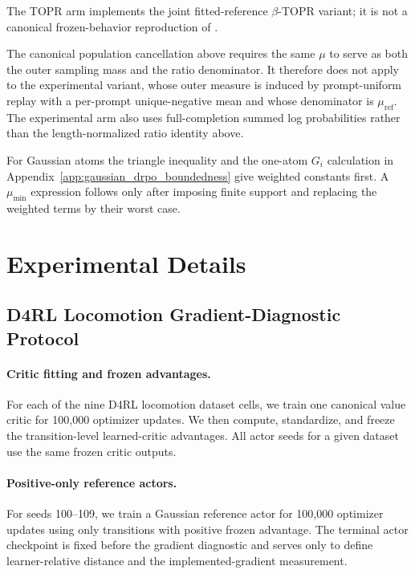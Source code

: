 \documentclass{article}
\theoremstyle{plain}
\theoremstyle{definition}
\theoremstyle{remark}
\begin{document}
The TOPR arm implements the joint fitted-reference
\(\beta\)-TOPR variant; it is not a canonical frozen-behavior
reproduction of \citet{leroux2025tapered}.

The canonical population cancellation above requires the same
\(\mu\) to serve as both the outer sampling mass and the ratio
denominator. It therefore does not apply to the experimental variant,
whose outer measure is induced by prompt-uniform replay with a
per-prompt unique-negative mean and whose denominator is
\(\mu_{\mathrm{ref}}\). The experimental arm also uses
full-completion summed log probabilities rather than the
length-normalized ratio identity above.

For Gaussian atoms the
triangle inequality and the one-atom \(G_i\) calculation in
Appendix~\ref{app:gaussian_drpo_boundedness} give weighted constants
first. A \(\mu_{\min}\) expression follows only after imposing finite
support and replacing the weighted terms by their worst case.

\section{Experimental Details}
\label{app:experimental_details}

\subsection{D4RL Locomotion Gradient-Diagnostic Protocol}
\label{app:d4rl_gradient_diagnostic}

\paragraph{Critic fitting and frozen advantages.}
For each of the nine D4RL locomotion dataset cells, we train one canonical
value critic for 100,000 optimizer updates. We then compute, standardize, and
freeze the transition-level learned-critic advantages. All actor seeds for a
given dataset use the same frozen critic outputs.

\paragraph{Positive-only reference actors.}
For seeds 100--109, we train a Gaussian reference actor for 100,000 optimizer
updates using only transitions with positive frozen advantage. The terminal
actor checkpoint is fixed before the gradient diagnostic and serves only to
define learner-relative distance and the implemented-gradient measurement.
\end{document}
